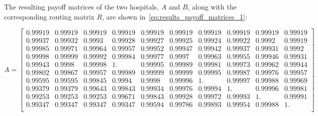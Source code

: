 The resulting payoff matrices of the two hospitals, \(A\) and \(B\), along with
the corresponding routing matrix \(R\), are shown
in~\eqref{eq:results_payoff_matrices_1}:

\scriptsize
\begin{equation*}
    A = 
    \begin{bmatrix}
        0.99919 & 0.99919 & 0.99919 & 0.99919 & 0.99919 &0.99919 & 0.99919 &
        0.99919 & 0.99919 & 0.99919 \\
        0.99937 & 0.99932 & 0.9993  & 0.99928 & 0.99927 &0.99925 & 0.99924 &
        0.99922 & 0.9992  & 0.99919 \\
        0.99985 & 0.99971 & 0.99964 & 0.99957 & 0.99952 &0.99947 & 0.99942 &
        0.99937 & 0.99931 & 0.9992  \\
        0.99998 & 0.99999 & 0.99992 & 0.99984 & 0.99977 &0.9997  & 0.99963 &
        0.99955 & 0.99946 & 0.99931 \\
        0.99943 & 0.9998  & 0.99998 & 1.      & 0.99995 &0.99989 & 0.99981 &
        0.99973 & 0.99962 & 0.99944 \\
        0.99802 & 0.99867 & 0.99957 & 0.99989 & 0.99999 &0.99999 & 0.99995 &
        0.99987 & 0.99976 & 0.99957 \\
        0.99595 & 0.99595 & 0.99845 & 0.9994  & 0.9998  &0.99996 & 1.      &
        0.99997 & 0.99988 & 0.99969 \\
        0.99379 & 0.99379 & 0.99643 & 0.99843 & 0.99934 &0.99976 & 0.99994 &
        1.      & 0.99996 & 0.99981 \\
        0.99253 & 0.99253 & 0.99253 & 0.99671 & 0.99843 &0.99928 & 0.99972 &
        0.99993 & 1.      & 0.99991 \\
        0.99347 & 0.99347 & 0.99347 & 0.99347 & 0.99594 &0.99786 & 0.99893 &
        0.99954 & 0.99988 & 1.      \\
    \end{bmatrix}
\end{equation*}


